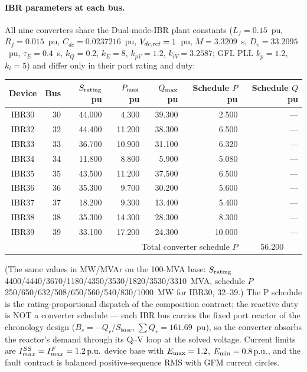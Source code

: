 \documentclass[12pt,a4paper]{article}
\newcommand{\pu}{\ifmmode\,\mathrm{p.u.}\else\ p.u.\fi}
\begin{document}
\paragraph{IBR parameters at each bus.}  All nine converters share the
Dual-mode-IBR plant constants ($L_f=0.15$~pu, $R_f=0.015$~pu,
$C_{dc}=0.0237216$~pu, $V_{dc,\rm ref}=1$~pu, $M=3.3209$~s,
$D_v=33.2095$~pu, $\tau_E=0.4$~s, $k_Q=0.2$, $k_E=8$, $k_{pV}=1.2$,
$k_{iV}=3.2587$; GFL PLL $k_p=1.2$, $k_i=5$) and differ only in their port
rating and duty:
\begin{center}\footnotesize
\begin{tabular}{crrrrrr}
\toprule
Device & Bus & $S_{\rm rating}$ pu & $P_{\rm max}$ pu & $Q_{\rm max}$ pu & Schedule $P$ pu & Schedule $Q$ pu\\
\midrule
IBR30 & 30 & 44.000 & 4.300  & 39.300 & 2.500  & ---\\
IBR32 & 32 & 44.400 & 11.200 & 38.300 & 6.500  & ---\\
IBR33 & 33 & 36.700 & 10.900 & 31.100 & 6.320  & ---\\
IBR34 & 34 & 11.800 & 8.800  & 5.900  & 5.080  & ---\\
IBR35 & 35 & 43.500 & 11.200 & 37.500 & 6.500  & ---\\
IBR36 & 36 & 35.300 & 9.700  & 30.200 & 5.600  & ---\\
IBR37 & 37 & 18.200 & 9.300  & 13.400 & 5.400  & ---\\
IBR38 & 38 & 35.300 & 14.300 & 28.300 & 8.300  & ---\\
IBR39 & 39 & 33.100 & 17.200 & 24.300 & 10.000 & ---\\
\midrule
\multicolumn{6}{r}{Total converter schedule $P$} & \multicolumn{1}{c}{56.200}\\
\bottomrule
\end{tabular}
\end{center}
(The same values in MW/MVAr on the 100-MVA base: $S_{\rm rating}$
4400/4440/3670/1180/4350/3530/1820/3530/3310~MVA, schedule $P$
250/650/632/508/650/560/540/830/1000~MW for IBR30, 32--39.)
The P schedule is the rating-proportional dispatch of the composition
contract; the reactive duty is NOT a converter schedule --- each IBR bus
carries the fixed port reactor of the chronology design
($B_s=-Q_r/S_{base}$, $\sum Q_r = 161.69$~pu), so the converter absorbs
the reactor's demand through its Q--V loop at the solved voltage.  Current
limits are $I_{max}^{SS}=I_{max}^{F}=1.2\pu$ device base with
$E_{\rm max}=1.2$, $E_{\rm min}=0.8\pu$, and the fault contract is balanced
positive-sequence RMS with GFM current circles.
\end{document}
